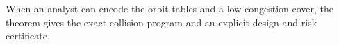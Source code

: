 When an analyst can encode the orbit tables and a low-congestion cover, the theorem gives the exact collision program and an explicit design and risk certificate.